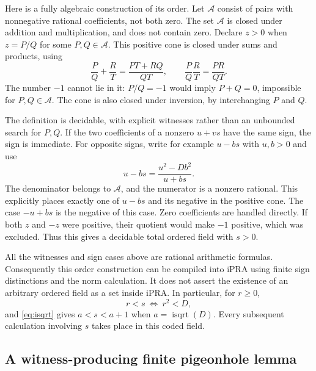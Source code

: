 \documentclass[11pt,letterpaper]{article}
\theoremstyle{definition}
\newcommand{\isqrt}{\operatorname{isqrt}}
\begin{document}
Here is a fully algebraic construction of its order. Let $\mathcal A$
consist of pairs with nonnegative rational coefficients, not both zero.
The set $\mathcal A$ is closed under addition and multiplication, and does
not contain zero. Declare $z>0$ when $z=P/Q$ for some $P,Q\in\mathcal A$.
This positive cone is closed under sums and products, using
\[
 \frac P Q+\frac R T=\frac{PT+RQ}{QT},\qquad
 \frac P Q\frac R T=\frac{PR}{QT}.
\]
The number $-1$ cannot lie in it: $P/Q=-1$ would imply $P+Q=0$, impossible
for $P,Q\in\mathcal A$.
The cone is also closed under inversion, by interchanging $P$ and $Q$.

The definition is decidable, with explicit witnesses rather than an
unbounded search for $P,Q$. If the two coefficients of a nonzero $u+vs$
have the same sign, the sign is immediate. For opposite signs, write for
example $u-bs$ with $u,b>0$ and use
\begin{equation}\label{eq:signformula}
 u-bs=\frac{u^2-Db^2}{u+bs}.
\end{equation}
The denominator belongs to $\mathcal A$, and the numerator is a nonzero
rational. This explicitly places exactly one of $u-bs$ and its negative
in the positive cone. The case $-u+bs$ is the negative of this case.
Zero coefficients are handled directly. If both $z$ and $-z$ were positive,
their quotient would make $-1$ positive, which was excluded. Thus this gives
a decidable total ordered field with $s>0$.

All the witnesses and sign cases above are rational arithmetic formulas.
Consequently this order construction can be compiled into iPRA using
finite sign distinctions and the norm calculation. It does not assert the
existence of an arbitrary ordered field as a set inside iPRA. In particular,
for $r\ge0$,
\[
 r<s\ \Longleftrightarrow\ r^2<D,
\]
and \eqref{eq:isqrt} gives $a<s<a+1$ when $a=\isqrt(D)$.
Every subsequent calculation involving $s$ takes place in this coded field.

\subsection{A witness-producing finite pigeonhole lemma}\label{sec:pigeonhole}
\end{document}

